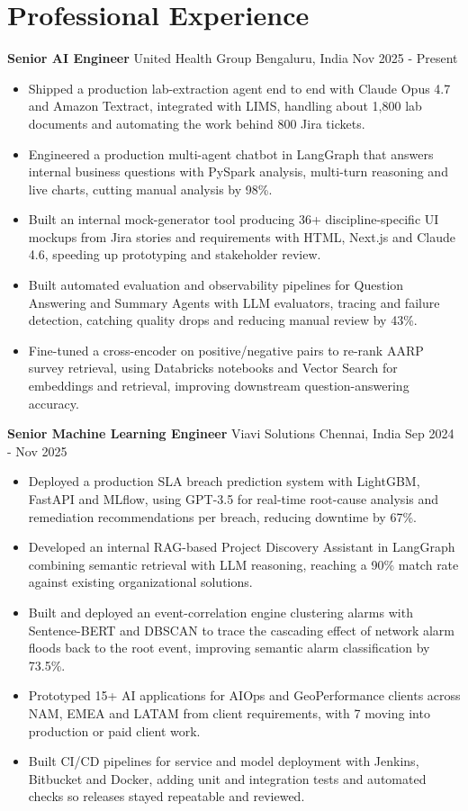 \documentclass[10pt,a4paper]{article}
\newcommand{\role}[4]{\textbf{#1} \textbar{} #2 \hfill #3 \textbar{} #4\par}
\begin{document}
\section{Professional Experience}
\role{Senior AI Engineer}{United Health Group}{Bengaluru, India}{Nov 2025 - Present}
\begin{itemize}
  \item Shipped a production lab-extraction agent end to end with Claude Opus 4.7 and Amazon Textract, integrated with LIMS, handling about 1,800 lab documents and automating the work behind 800 Jira tickets.
  \item Engineered a production multi-agent chatbot in LangGraph that answers internal business questions with PySpark analysis, multi-turn reasoning and live charts, cutting manual analysis by 98\%.
  \item Built an internal mock-generator tool producing 36+ discipline-specific UI mockups from Jira stories and requirements with HTML, Next.js and Claude 4.6, speeding up prototyping and stakeholder review.
  \item Built automated evaluation and observability pipelines for Question Answering and Summary Agents with LLM evaluators, tracing and failure detection, catching quality drops and reducing manual review by 43\%.
  \item Fine-tuned a cross-encoder on positive/negative pairs to re-rank AARP survey retrieval, using Databricks notebooks and Vector Search for embeddings and retrieval, improving downstream question-answering accuracy.
\end{itemize}
\vspace{3pt}
\role{Senior Machine Learning Engineer}{Viavi Solutions}{Chennai, India}{Sep 2024 - Nov 2025}
\begin{itemize}
  \item Deployed a production SLA breach prediction system with LightGBM, FastAPI and MLflow, using GPT-3.5 for real-time root-cause analysis and remediation recommendations per breach, reducing downtime by 67\%.
  \item Developed an internal RAG-based Project Discovery Assistant in LangGraph combining semantic retrieval with LLM reasoning, reaching a 90\% match rate against existing organizational solutions.
  \item Built and deployed an event-correlation engine clustering alarms with Sentence-BERT and DBSCAN to trace the cascading effect of network alarm floods back to the root event, improving semantic alarm classification by 73.5\%.
  \item Prototyped 15+ AI applications for AIOps and GeoPerformance clients across NAM, EMEA and LATAM from client requirements, with 7 moving into production or paid client work.
  \item Built CI/CD pipelines for service and model deployment with Jenkins, Bitbucket and Docker, adding unit and integration tests and automated checks so releases stayed repeatable and reviewed.
\end{itemize}
\end{document}
